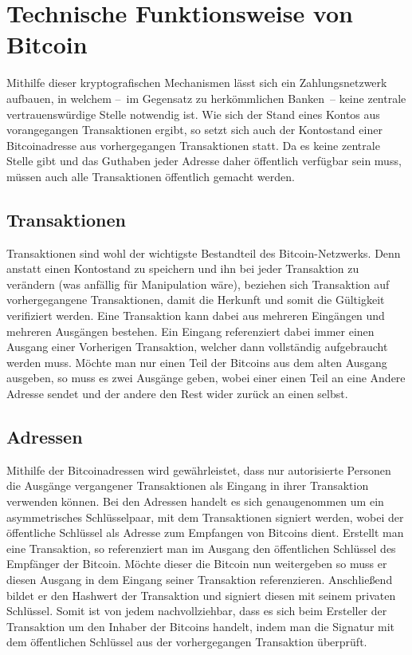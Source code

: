 \section{Technische Funktionsweise von Bitcoin}
\label{sec:mechanics}

Mithilfe dieser kryptografischen Mechanismen lässt sich ein Zahlungsnetzwerk aufbauen, in welchem --~im Gegensatz zu herkömmlichen Banken~-- keine zentrale vertrauenswürdige Stelle notwendig ist.
Wie sich der Stand eines Kontos aus vorangegangen Transaktionen ergibt, so setzt sich auch der Kontostand einer Bitcoinadresse aus vorhergegangen Transaktionen statt.
Da es keine zentrale Stelle gibt und das Guthaben jeder Adresse daher öffentlich verfügbar sein muss, müssen auch alle Transaktionen öffentlich gemacht werden.

\subsection{Transaktionen}

Transaktionen sind wohl der wichtigste Bestandteil des Bitcoin-Netzwerks.
Denn anstatt einen Kontostand zu speichern und ihn bei jeder Transaktion zu verändern (was anfällig für Manipulation wäre), beziehen sich Transaktion auf vorhergegangene Transaktionen, damit die Herkunft und somit die Gültigkeit verifiziert werden.
Eine Transaktion kann dabei aus mehreren Eingängen und mehreren Ausgängen bestehen.
Ein Eingang referenziert dabei immer einen Ausgang einer Vorherigen Transaktion, welcher dann vollständig aufgebraucht werden muss.
Möchte man nur einen Teil der Bitcoins aus dem alten Ausgang ausgeben, so muss es zwei Ausgänge geben, wobei einer einen Teil an eine Andere Adresse sendet und der andere den Rest wider zurück an einen selbst.

\subsection{Adressen}

Mithilfe der Bitcoinadressen wird gewährleistet, dass nur autorisierte Personen die Ausgänge vergangener Transaktionen als Eingang in ihrer Transaktion verwenden können.
Bei den Adressen handelt es sich genaugenommen um ein asymmetrisches Schlüsselpaar, mit dem Transaktionen signiert werden, wobei der öffentliche Schlüssel als Adresse zum Empfangen von Bitcoins dient.
Erstellt man eine Transaktion, so referenziert man im Ausgang den öffentlichen Schlüssel des Empfänger der Bitcoin.
Möchte dieser die Bitcoin nun weitergeben so muss er diesen Ausgang in dem Eingang seiner Transaktion referenzieren.
Anschließend bildet er den Hashwert der Transaktion und signiert diesen mit seinem privaten Schlüssel.
Somit ist von jedem nachvollziehbar, dass es sich beim Ersteller der Transaktion um den Inhaber der Bitcoins handelt, indem man die Signatur mit dem öffentlichen Schlüssel aus der vorhergegangen Transaktion überprüft.

